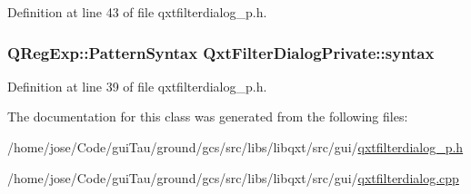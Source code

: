 Definition at line 43 of file qxtfilterdialog\-\_\-p.\-h.

\hypertarget{class_qxt_filter_dialog_private_a85973f0d91d9bdcf58009d7ff55a1a64}{
\subsubsection[{syntax}]{\setlength{\rightskip}{0pt plus 5cm}Q\-Reg\-Exp\-::\-Pattern\-Syntax Qxt\-Filter\-Dialog\-Private\-::syntax}}\label{class_qxt_filter_dialog_private_a85973f0d91d9bdcf58009d7ff55a1a64}


Definition at line 39 of file qxtfilterdialog\-\_\-p.\-h.



The documentation for this class was generated from the following files\-:\begin{DoxyCompactItemize}
\item 
/home/jose/\-Code/gui\-Tau/ground/gcs/src/libs/libqxt/src/gui/\hyperlink{qxtfilterdialog__p_8h}{qxtfilterdialog\-\_\-p.\-h}\item 
/home/jose/\-Code/gui\-Tau/ground/gcs/src/libs/libqxt/src/gui/\hyperlink{qxtfilterdialog_8cpp}{qxtfilterdialog.\-cpp}\end{DoxyCompactItemize}
